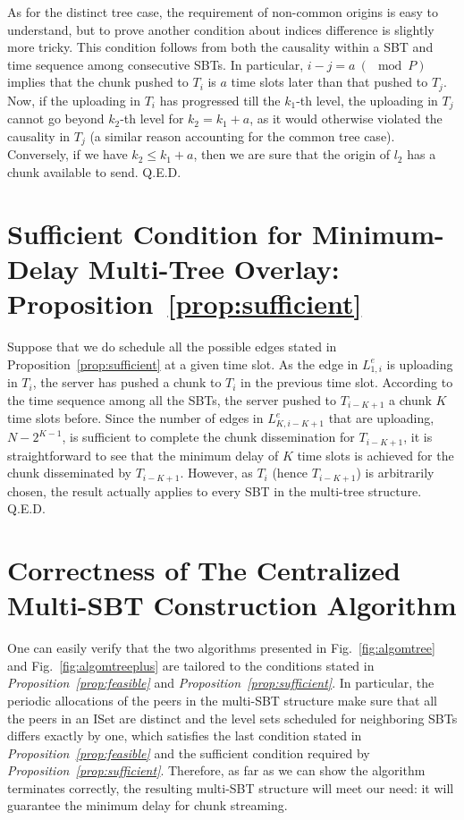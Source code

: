 \documentclass[conference]{IEEEtran}
\begin{document}
  As for the distinct tree case, the requirement of non-common origins is easy to understand, but to prove another condition about indices difference is slightly more tricky. This condition follows from both the causality within a SBT and time sequence among consecutive SBTs. In particular, $i-j=a~(\!\!\!\!\mod P)$ implies that the chunk pushed to $T_i$ is $a$ time slots later than that pushed to $T_j$. Now, if the uploading in $T_i$ has progressed till the $k_1$-th level, the uploading in $T_j$ cannot go beyond $k_2$-th level for $k_2 = k_1 + a$, as it would otherwise violated the causality in $T_j$ (a similar reason accounting for the common tree case). Conversely, if we have $k_2 \leq k_1 + a$, then we are sure that the origin of $l_2$ has a chunk available to send. \hfill Q.E.D.

\section{Sufficient Condition for Minimum-Delay Multi-Tree Overlay: Proposition~\ref{prop:sufficient}} \label{sec:mdmtree}
Suppose that we do schedule all the possible edges stated in Proposition~\ref{prop:sufficient} at a given time slot. As the edge in $L^e_{1,i}$ is uploading in $T_i$, the server has pushed a chunk to $T_i$ in the previous time slot. According to the time sequence among all the SBTs, the server pushed to $T_{i-K+1}$ a chunk $K$ time slots before. Since the number of edges in $L^e_{K,i-K+1}$ that are uploading, $N-2^{K-1}$, is sufficient to complete the chunk dissemination for $T_{i-K+1}$, it is straightforward to see that the minimum delay of $K$ time slots is achieved for the chunk disseminated by $T_{i-K+1}$. However, as $T_i$ (hence $T_{i-K+1}$) is arbitrarily chosen, the result actually applies to every SBT in the multi-tree structure. \hfill Q.E.D.

\vfill\eject
\section{Correctness of The Centralized Multi-SBT Construction Algorithm} \label{sec:algomtree}
One can easily verify that the two algorithms presented in Fig.~\ref{fig:algomtree} and Fig.~\ref{fig:algomtreeplus} are tailored to the conditions stated in \textit{Proposition~\ref{prop:feasible}} and \textit{Proposition~\ref{prop:sufficient}}. In particular, the periodic allocations of the peers in the multi-SBT structure make sure that all the peers in an ISet are distinct and the level sets scheduled for neighboring SBTs differs exactly by one, which satisfies the last condition stated in  \textit{Proposition~\ref{prop:feasible}} and the sufficient condition required by \textit{Proposition~\ref{prop:sufficient}}. Therefore, as far as we can show the algorithm terminates correctly, the resulting multi-SBT structure will meet our need: it will guarantee the minimum delay for chunk streaming.
\end{document}
